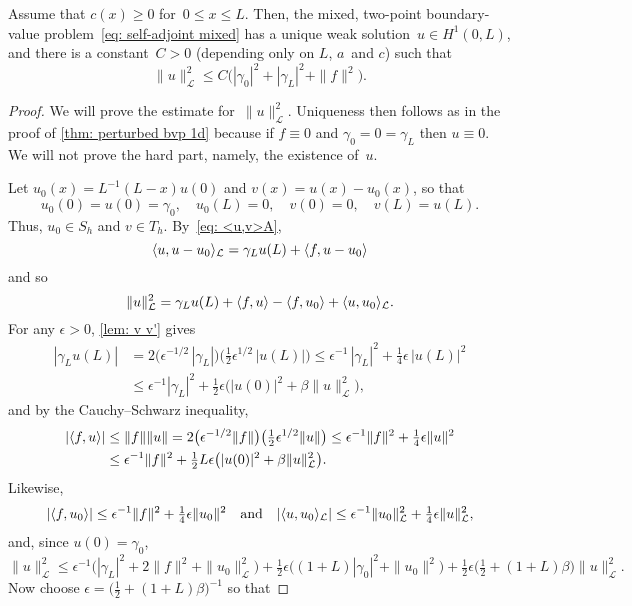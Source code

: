 \begin{theorem}\label{thm: ||u||A}
Assume that $c(x)\ge0$ for~$0\le x\le L$.  Then, the mixed, two-point 
boundary-value problem~\eqref{eq: self-adjoint mixed} has a unique weak
solution~$u\in H^1(0,L)$, and there is a constant~$C>0$ (depending only on $L$,
$a$~and $c$) such that
\[
\|u\|_{\mathcal{L}}^2\le C\bigl(|\gamma_0|^2+|\gamma_L|^2+\|f\|^2\bigr).
\]
\end{theorem}
\begin{proof}
We will prove the estimate for~$\|u\|_{\mathcal{L}}^2$.  Uniqueness then
follows as in the proof of \cref{thm: perturbed bvp 1d} because if
$f\equiv0$ and $\gamma_0=0=\gamma_L$ then $u\equiv0$.  We will not prove the
hard part, namely, the existence of~$u$.

Let $u_0(x)=L^{-1}(L-x)u(0)$ and $v(x)=u(x)-u_0(x)$, so that
\[
u_0(0)=u(0)=\gamma_0,\quad u_0(L)=0,\quad v(0)=0,\quad v(L)=u(L).
\]
Thus, $u_0\in S_h$ and $v\in T_h$. By~\eqref{eq: <u,v>A},
\[
\langle u,u-u_0\rangle_{\mathcal{L}}=\gamma_Lu(L)+\langle f,u-u_0\rangle
\]
and so
\[
\|u\|_{\mathcal{L}}^2=\gamma_L u(L)+\langle f,u\rangle-\langle f,u_0\rangle
	+\langle u,u_0\rangle_{\mathcal{L}}.
\]
For any $\epsilon>0$, \cref{lem: v v'} gives
\begin{align*}
|\gamma_L u(L)|&=2\bigl(\epsilon^{-1/2}\,|\gamma_L|\bigr)
	\bigl(\tfrac12\epsilon^{1/2}\,|u(L)|\bigr)
\le\epsilon^{-1}\,|\gamma_L|^2
	+\tfrac14\epsilon\,|u(L)|^2\\
	&\le\epsilon^{-1}|\gamma_L|^2+\tfrac12\epsilon\bigl(|u(0)|^2
	+\beta\|u\|_{\mathcal{L}}^2\bigr),
\end{align*}
and by the Cauchy--Schwarz inequality,
\begin{align*}
|\langle f,u\rangle|&\le\|f\|\|u\|=2\bigl(\epsilon^{-1/2}\|f\|\bigr)
	\bigl(\tfrac12\epsilon^{1/2}\|u\|\bigr)
	\le\epsilon^{-1}\|f\|^2+\tfrac14\epsilon\|u\|^2\\
	&\le\epsilon^{-1}\|f\|^2
	+\tfrac12 L\epsilon\bigl(|u(0)|^2+\beta\|u\|_{\mathcal{L}}^2\bigr).
\end{align*}
Likewise,
\[
|\langle f,u_0\rangle|\le\epsilon^{-1}\|f\|^2+\tfrac14\epsilon\|u_0\|^2
\quad\text{and}\quad
|\langle u,u_0\rangle_{\mathcal{L}}|\le\epsilon^{-1}\|u_0\|_{\mathcal{L}}^2
	+\tfrac14\epsilon\|u\|_{\mathcal{L}}^2,
\]
and, since $u(0)=\gamma_0$,
\[
\|u\|_{\mathcal{L}}^2
    \le\epsilon^{-1}\bigl(|\gamma_L|^2+2\|f\|^2+\|u_0\|_{\mathcal{L}}^2\bigr)
+\tfrac12\epsilon\bigl((1+L)|\gamma_0|^2+\|u_0\|^2\bigr)
+\tfrac12\epsilon\bigl(\tfrac12+(1+L)\beta\bigr)\|u\|_{\mathcal{L}}^2.
\]
Now choose $\epsilon=\bigl(\tfrac12+(1+L)\beta\bigr)^{-1}$ so that

\end{proof}
